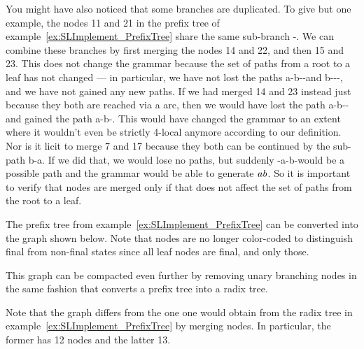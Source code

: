 You might have also noticed that some branches are duplicated.
To give but one example, the nodes 11 and 21 in the prefix tree of example~\ref{ex:SLImplement_PrefixTree} share the same sub-branch \RightEdge-\RightEdge.
We can combine these branches by first merging the nodes 14 and 22, and then 15 and 23.
This does not change the grammar because the set of paths from a root to a leaf has not changed --- in particular, we have not lost the paths a-b-\RightEdge-\RightEdge and b-\RightEdge-\RightEdge-\RightEdge, and we have not gained any new paths.
If we had merged 14 and 23 instead just because they both are reached via a \RightEdge arc, then we would have lost the path a-b-\RightEdge-\RightEdge and gained the path a-b-\RightEdge.
This would have changed the grammar to an extent where it wouldn't even be strictly 4-local anymore according to our definition.
Nor is it licit to merge 7 and 17 because they both can be continued by the sub-path b-a.
If we did that, we would lose no paths, but suddenly \LeftEdge-a-b-\RightEdge would be a possible path and the grammar would be able to generate $\mathit{ab}$.
So it is important to verify that nodes are merged only if that does not affect the set of paths from the root to a leaf.
%
\begin{examplebox}
    The prefix tree from example~\ref{ex:SLImplement_PrefixTree} can be converted into the graph shown below.
    \label{ex:SLImplement_DAG}
    Note that nodes are no longer color-coded to distinguish final from non-final states since all leaf nodes are final, and only those.
    \begin{center}
        
    \end{center}
    This graph can be compacted even further by removing unary branching nodes in the same fashion that converts a prefix tree into a radix tree.
    \begin{center}
        
    \end{center}
    Note that the graph differs from the one one would obtain from the radix tree in example~\ref{ex:SLImplement_PrefixTree} by merging nodes.
    In particular, the former has 12 nodes and the latter 13.
\end{examplebox}

